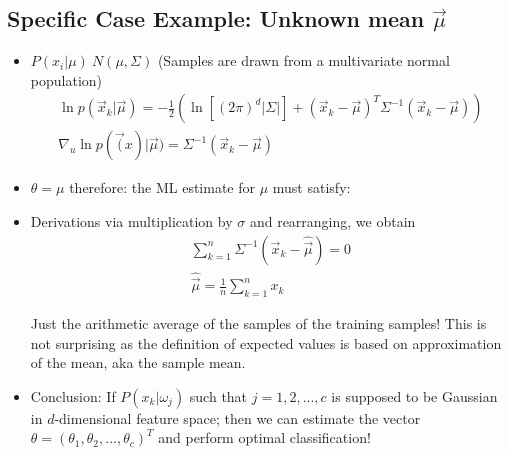 \documentclass[11pt]{article}
\begin{document}
\subsection{Specific Case Example: Unknown mean $\vec{\mu}$}
\begin{itemize}
	\item $P(x_i | \mu) ~ N (\mu, \Sigma)$ (Samples are drawn from a multivariate normal population)
	\begin{eqnarray}
		\ln p(\vec{x}_k | \vec{\mu}) = - \frac{1}{2}( \ln [(2\pi)^d |\Sigma |] + (\vec{x}_k - \vec{\mu})^T \Sigma^{-1} (\vec{x}_k - \vec{\mu})) \\
		\nabla _u \ln p(\vec(x) | \vec{\mu}) = \Sigma ^{-1} (\vec{x}_k - \vec{\mu} )  
	\end{eqnarray}
	
	\item $\theta = \mu$ therefore: the ML estimate for $\mu$ must satisfy: 
	\item Derivations via multiplication by $\sigma$ and rearranging, we obtain
	\begin{eqnarray}
	\sum _{k=1}^n \Sigma^{-1} (\vec{x}_k - \hat{\vec{\mu}}) = 0 \\
	\hat{\vec{\mu}} = \frac{1}{n} \sum _{k=1}^n x_k 
	\end{eqnarray}
	
	Just the arithmetic average of the samples of the training samples!  This is not surprising as the definition of expected values is based on approximation of the mean, aka the sample mean.
	\item Conclusion: If $P(x_k | \omega_j)$ such that $j=1,2,...,c$ is supposed to be Gaussian in $d$-dimensional feature space; then we can estimate the vector $\theta = (\theta_1, \theta_2, ..., \theta_c)^T$ and perform optimal classification!
\end{itemize}
\end{document}
